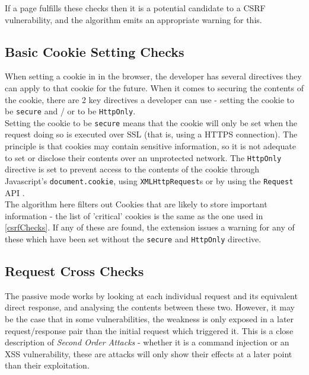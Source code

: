If a page fulfills these checks then it is a potential candidate to a CSRF vulnerability, and the algorithm emits an appropriate warning for this. 

\subsection{Basic Cookie Setting Checks}

When setting a cookie in in the browser, the developer has several directives they can apply to that cookie for the future. When it comes to securing the contents of the cookie, there are 2 key directives a developer can use - setting the cookie to be \texttt{secure} and / or to be \texttt{HttpOnly}. \\

Setting the cookie to be \texttt{secure} means that the cookie will only be set when the request doing so is executed over SSL (that is, using a HTTPS connection). The principle is that cookies may contain sensitive information, so it is not adequate to set or disclose their contents over an unprotected network. The \texttt{HttpOnly} directive is set to prevent access to the contents of the cookie through Javascript's \texttt{document.cookie}, using \texttt{XMLHttpRequest}s or by using the \texttt{Request} API \cite{setCookie}. \\ 

The algorithm here filters out Cookies that are likely to store important information - the list of 'critical' cookies is the same as the one used in \ref{csrfChecks}. If any of these are found, the extension issues a warning for any of these which have been set without the \texttt{secure} and \texttt{HttpOnly} directive. 

\subsection{Request Cross Checks}

The passive mode works by looking at each individual request and its equivalent direct response, and analysing the contents between these two. However, it may be the case that in some vulnerabilities, the weakness is only exposed in a later request/response pair than the initial request which triggered it. This is a close description of \textit{Second Order Attacks} - whether it is a command injection or an XSS vulnerability, these are attacks will only show their effects at a later point than their exploitation. \\

